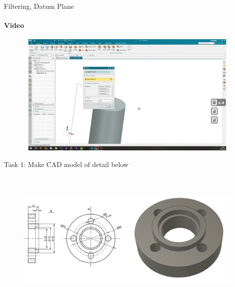 \documentclass[aspectratio=169]{beamer}
\begin{document}
\begin{frame}[t]{Filtering, Datum Plane}
    \framesubtitle{Video}
    \vspace{-0.6cm}
    \begin{figure}[H]
        \href{https://disk.yandex.ru/d/ycnpXzZmo62SiA}{
            \centering\includegraphics[height=6cm,width=1\textwidth,keepaspectratio]{resources/filtering_video.png}}
        \label{fig:resources/filtering_video.png}
    \end{figure}
\end{frame}

\begin{frame}[t]{Task 1: Make CAD model of detail below}
\framesubtitle{}
    \vspace{-0.6cm}
    \begin{figure}[H]
        \centering\includegraphics[height=6.5cm,width=1\textwidth,keepaspectratio]{resources/task_1.png}
        \label{fig:resources/task_1.png}
    \end{figure}
\end{frame}
\end{document}
